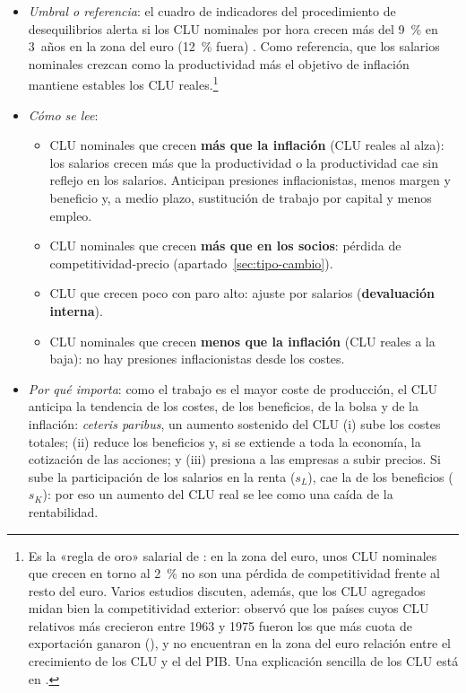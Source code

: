 \documentclass[11pt]{article}
\begin{document}
\begin{itemize}
\item \emph{Umbral o referencia}: el cuadro de indicadores del procedimiento de desequilibrios alerta si los CLU nominales por hora crecen más del 9~\% en 3~años en la zona del euro (12~\% fuera) \parencite{CE2025AMR2026}. Como referencia, que los salarios nominales crezcan como la productividad más el objetivo de inflación mantiene estables los CLU reales.\footnote{Es la «regla de oro» salarial de \textcite{Watt2007WageSetting}: en la zona del euro, unos CLU nominales que crecen en torno al 2~\% no son una pérdida de competitividad frente al resto del euro. Varios estudios discuten, además, que los CLU agregados midan bien la competitividad exterior: \textcite{Kaldor1978} observó que los países cuyos CLU relativos más crecieron entre 1963 y 1975 fueron los que más cuota de exportación ganaron (), y \textcite{FelipeKumar2011} no encuentran en la zona del euro relación entre el crecimiento de los CLU y el del PIB. Una explicación sencilla de los CLU está en \textcite{UCM2015CLU}.}
\item \emph{Cómo se lee}:
  \begin{itemize}
  \item CLU nominales que crecen \textbf{más que la inflación} (CLU reales al alza): los salarios crecen más que la productividad o la productividad cae sin reflejo en los salarios. Anticipan presiones inflacionistas, menos margen y beneficio y, a medio plazo, sustitución de trabajo por capital y menos empleo.
  \item CLU nominales que crecen \textbf{más que en los socios}: pérdida de competitividad-precio (apartado~\ref{sec:tipo-cambio}).
  \item CLU que crecen poco con paro alto: ajuste por salarios (\textbf{devaluación interna}).
  \item CLU nominales que crecen \textbf{menos que la inflación} (CLU reales a la baja): no hay presiones inflacionistas desde los costes.
  \end{itemize}
\item \emph{Por qué importa}: como el trabajo es el mayor coste de producción, el CLU anticipa la tendencia de los costes, de los beneficios, de la bolsa y de la inflación: \emph{ceteris paribus}, un aumento sostenido del CLU (i) sube los costes totales; (ii) reduce los beneficios y, si se extiende a toda la economía, la cotización de las acciones; y (iii) presiona a las empresas a subir precios. Si sube la participación de los salarios en la renta ($s_L$), cae la de los beneficios ($s_K$): por eso un aumento del CLU real se lee como una caída de la rentabilidad.

\end{itemize}
\end{document}
